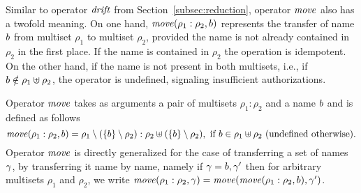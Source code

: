 Similar to operator $\mathit {drift}$ from Section~\ref{subsec:reduction}, operator $\mathit{move}$ also has a twofold meaning. On one hand, $\mathit{move}(\rho_1:\rho_2,b)$ represents
the transfer of name $b$ from multiset $\rho_1$ to multiset $\rho_2$, provided the name 
is not already contained in $\rho_2$ in the first place. If the name is contained in $\rho_2$ the operation is idempotent. 
On the other hand, if the name is not present in both multisets, i.e., if $b\notin\rho_1\uplus\rho_2$, the operator is undefined, signaling insufficient authorizations.   

\begin{definition}\label{def:operator_move}
Operator $\mathit{move}$ takes as 
arguments a pair of multisets $\rho_1:\rho_2$ and a name $b$ and is defined as follows
\[
\mathit{move}(\rho_1:\rho_2,b)=\rho_1\setminus(\{b\}\setminus\rho_2):\rho_2\uplus(\{b\}\setminus\rho_2),
 \text{ if }  b\in\rho_1\uplus\rho_2  \text{ (undefined otherwise)}.
\]
Operator $\mathit{move}$ is directly generalized for the case of transferring a set of names $\gamma$, 
by transferring it name by name, namely if $\gamma=b,\gamma'$ then
for arbitrary %
multisets $\rho_1$ and $\rho_2$, we  write 
$\mathit{move}(\rho_1: \rho_2, \gamma)=\mathit{move}(\mathit{move}(\rho_1:\rho_2,b),\gamma')$.
\end{definition}

